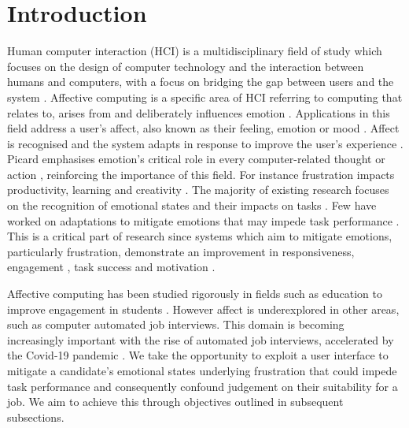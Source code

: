 \documentclass[12pt,a4paper]{article}
\begin{document}
\section{Introduction}
Human computer interaction (HCI) is a multidisciplinary field of study which focuses on the design of computer technology and the interaction between humans and computers, with a focus on bridging the gap between users and the system \cite{pantic2003toward}. Affective computing is a specific area of HCI referring to computing that relates to, arises from and deliberately influences emotion \cite{picard2000affective}. Applications in this field address a user's affect, also known as their feeling, emotion or mood \cite{picard2000affective}. Affect is recognised and the system adapts in response to improve the user's experience \cite{klein2002computer}. Picard emphasises emotion's critical role in every computer-related thought or action \cite{picard2000affective}, reinforcing the importance of this field. For instance frustration impacts productivity, learning and creativity \cite{amsel1992frustration}. The majority of existing research focuses on the recognition of emotional states and their impacts on tasks \cite{giannopoulos2018deep} \cite{ceaparu2004determining}. Few have worked on adaptations to mitigate emotions that may impede task performance \cite{yang2015effect}. This is a critical part of research since systems which aim to mitigate emotions, particularly frustration, demonstrate an improvement in responsiveness, engagement \cite{huber2016recognizing}, task success \cite{wang2008politeness} and motivation \cite{aist2002experimentally}. 

Affective computing has been studied rigorously in fields such as education to improve engagement in students \cite{woolf2009affect}. However affect is underexplored in other areas, such as computer automated job interviews. This domain is becoming increasingly important with the rise of automated job interviews, accelerated by the Covid-19 pandemic \cite{WhyUseaV18:online}. We take the opportunity to exploit a user interface to mitigate a candidate's emotional states underlying frustration that could impede task performance and consequently confound judgement on their suitability for a job. We aim to achieve this through objectives outlined in subsequent subsections.
\end{document}
